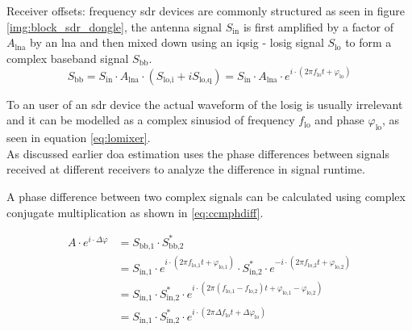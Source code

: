 \begin{subchapter}{Receiver offsets: frequency}
  \Gls{sdr} devices are commonly structured as seen in
  figure \ref{img:block_sdr_dongle}, the antenna signal
  $S_\text{in}$ is first amplified by a factor of
  $A_\text{lna}$ by an \acrshort{lna} and then mixed
  down using an \acrshort{iqsig} - \acrshort{losig} signal
  $S_\text{lo}$ to form a complex baseband signal
  $S_\text{bb}$. \\

  \begin{equation}
    \label{eq:lomixer}
    S_\text{bb}
    = S_\text{in} \cdot A_\text{lna} \cdot
      \left( S_\text{lo,i} + i S_\text{lo,q} \right)
    = S_\text{in} \cdot A_\text{lna} \cdot
      e^{i \cdot \left( 2 \pi f_\text{lo} t + \varphi_\text{lo} \right)}
  \end{equation}

  To an user of an \gls{sdr} device the actual waveform
  of the \gls{losig} is usually irrelevant and it can be
  modelled as a complex sinusiod of frequency $f_\text{lo}$
  and phase $\varphi_\text{lo}$, as seen in equation \ref{eq:lomixer}. \\

  As discussed earlier \gls{doa} estimation uses the phase
  differences between signals received at different receivers
  to analyze the difference in signal runtime.

  A phase difference between two complex signals can be
  calculated using complex conjugate multiplication as
  shown in \ref{eq:ccmphdiff}.

  \begin{align}
    \label{eq:ccmphdiff}
    A \cdot e^{i \cdot \Delta \varphi}
    &= S_\text{bb,1} \cdot S_\text{bb,2}^\ast \\
    &= S_\text{in,1} \cdot
       e^{i \cdot \left( 2 \pi f_\text{lo,1} t + \varphi_\text{lo,1} \right)}
       \cdot
       S_\text{in,2}^\ast \cdot
       e^{-i \cdot \left( 2 \pi f_\text{lo,2} t + \varphi_\text{lo,2} \right)} \nonumber \\
    &= S_\text{in,1} \cdot S_\text{in,2}^\ast \cdot
       e^{i \cdot \left(
         2 \pi (f_\text{lo,1} - f_\text{lo,2}) t
         + \varphi_\text{lo,1} - \varphi_\text{lo,2}
       \right)} \nonumber \\
    \label{eq:ccmpoff}
    &= S_\text{in,1} \cdot S_\text{in,2}^\ast \cdot
       e^{i \cdot \left(
         2 \pi \Delta f_\text{lo} t
         + \Delta \varphi_\text{lo}
       \right)}
  \end{align}


\end{subchapter}
